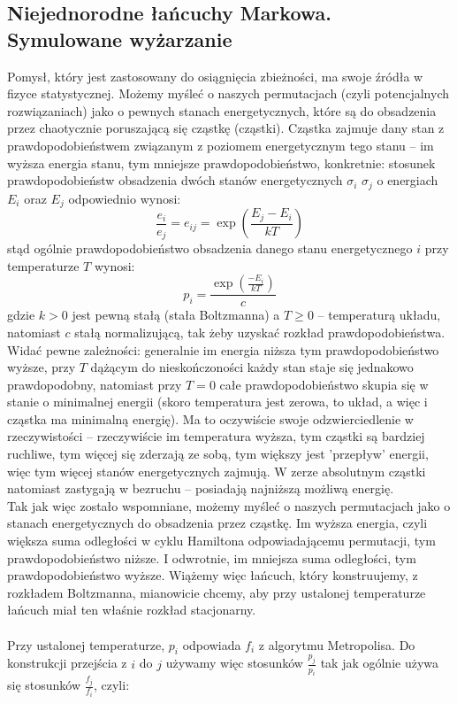 \documentclass[a4paper]{article}
\theoremstyle{defn}
\theoremstyle{theorem}
\theoremstyle{lemma}
\theoremstyle{cor}
\theoremstyle{fact}
\begin{document}
\subsection{Niejednorodne łańcuchy Markowa. Symulowane wyżarzanie}
Pomysł, który jest zastosowany do osiągnięcia zbieżności, ma swoje źródła w fizyce statystycznej. Możemy myśleć o naszych permutacjach (czyli potencjalnych rozwiązaniach) jako o pewnych stanach energetycznych, które są do obsadzenia przez chaotycznie poruszającą się cząstkę (cząstki). Cząstka zajmuje dany stan z prawdopodobieństwem związanym z poziomem energetycznym tego stanu – im wyższa energia stanu, tym mniejsze prawdopodobieństwo, konkretnie: stosunek prawdopodobieństw obsadzenia dwóch stanów energetycznych $\sigma_i$ $\sigma_j$ o energiach $E_i$ oraz $E_j$ odpowiednio wynosi:
$$\frac{e_i}{e_j} = e_{ij} = \exp\left(\frac{E_j - E_i}{kT}\right)$$
stąd ogólnie prawdopodobieństwo obsadzenia danego stanu energetycznego $i$ przy temperaturze $T$ wynosi:
$$p_i = \frac{\exp(\frac{-E_i}{kT})}{c}$$
gdzie $k>0$ jest pewną stałą (stała Boltzmanna) a $T\geq0$ – temperaturą układu, natomiast $c$ stałą normalizującą, tak żeby uzyskać rozkład prawdopodobieństwa. Widać pewne zależności: generalnie im energia niższa tym prawdopodobieństwo wyższe, przy $T$ dążącym do nieskończoności każdy stan staje się jednakowo prawdopodobny, natomiast przy $T=0$ całe prawdopodobieństwo skupia się w stanie o minimalnej energii (skoro temperatura jest zerowa, to układ, a więc i cząstka ma minimalną energię). Ma to oczywiście swoje odzwierciedlenie w rzeczywistości – rzeczywiście im temperatura wyższa, tym cząstki są bardziej ruchliwe, tym więcej się zderzają ze sobą, tym większy jest 'przepływ' energii, więc tym więcej stanów energetycznych zajmują. W zerze absolutnym cząstki natomiast zastygają w bezruchu – posiadają najniższą możliwą energię.\\
Tak jak więc zostało wspomniane, możemy myśleć o naszych permutacjach jako o stanach energetycznych do obsadzenia przez cząstkę. Im wyższa energia, czyli większa suma odległości w cyklu Hamiltona odpowiadającemu permutacji, tym prawdopodobieństwo niższe. I odwrotnie, im mniejsza suma odległości, tym prawdopodobieństwo wyższe. Wiążemy więc łańcuch, który konstruujemy, z rozkładem Boltzmanna, mianowicie chcemy, aby przy ustalonej temperaturze łańcuch miał ten właśnie rozkład stacjonarny.\\\\
Przy ustalonej temperaturze, $p_i$ odpowiada $f_i$ z algorytmu Metropolisa. Do konstrukcji przejścia z $i$ do $j$ używamy więc stosunków $\frac{p_j}{p_i}$ tak jak ogólnie używa się stosunków $\frac{f_j}{f_i}$, czyli:
\end{document}
